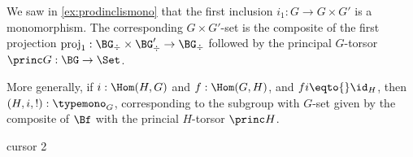 \begin{example}
  \label{ex:prodinclisGset}
  We saw in \cref{ex:prodinclismono} that the first inclusion $i_1:G\to G\times G'$ is a monomorphism.
  The corresponding $G\times G'$-set is the composite of the first projection $\mathrm{proj}_1:\BG_\div\times\BG'_\div\to \BG_\div$ followed by the principal $G$-torsor $\princ G:\BG\to\Set$.

  More generally, if $i:\Hom(H,G)$ and $f:\Hom(G,H)$, and $fi\eqto{}\id_H$, then $(H,i,!):\typemono_G$, corresponding to the subgroup with $G$-set given by the composite of $\Bf$ with the princial $H$-torsor $\princ H$.
\end{example}



{\large cursor 2}






